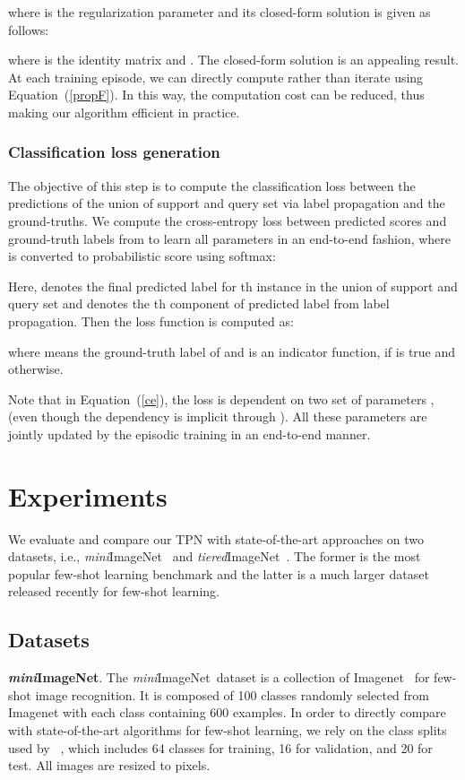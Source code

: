 \documentclass{article} \usepackage{iclr2019_conference,times}
\def\mini{{\textit{mini}ImageNet}}
\def\tiered{{\textit{tiered}ImageNet}}
\begin{document}
where  is the regularization parameter and its closed-form solution is given as follows:

where  is the identity matrix and . The closed-form solution is an appealing result. At each training episode, we can directly compute  rather than iterate using Equation~(\ref{propF}). In this way, the computation cost can be reduced, thus making our algorithm efficient in practice.
\fi

\subsubsection{Classification loss generation}
\label{loss}
The objective of this step is to compute the classification loss between the predictions of the union of support and query set via label propagation and the ground-truths.
We compute the cross-entropy loss between predicted scores  and
ground-truth labels from  to learn all parameters in an end-to-end fashion, where  is converted to probabilistic score using softmax:

Here,  denotes the final predicted label for th instance in the union of support and query set
and  denotes the th component of predicted label from label propagation.
Then the loss function is computed as:

where  means the ground-truth label of  and  is an indicator function,  if  is true and  otherwise.

Note that in Equation~(\ref{ce}), the loss is dependent on two set of parameters ,  (even though the dependency is implicit through ). All these parameters are jointly updated by the episodic training in an end-to-end manner. 



\section{Experiments}
We evaluate and compare our TPN with state-of-the-art approaches on two datasets, i.e., \mini~\citep{metaLSTM} and \tiered~\citep{semi-proto}. The former is the most popular few-shot learning benchmark and the latter is a  much larger dataset released recently for few-shot learning. 

\subsection{Datasets}
\textbf{\mini}. The \mini~dataset is a collection of Imagenet~\citep{imagenet} for few-shot image recognition. It is composed of 100 classes randomly selected from Imagenet with each class containing 600 examples. In order to directly compare with state-of-the-art algorithms for few-shot learning, we rely on the class splits used by ~\cite{metaLSTM}, which includes 64 classes for training, 16 for validation, and 20 for test. All images are resized to  pixels.
\end{document}

